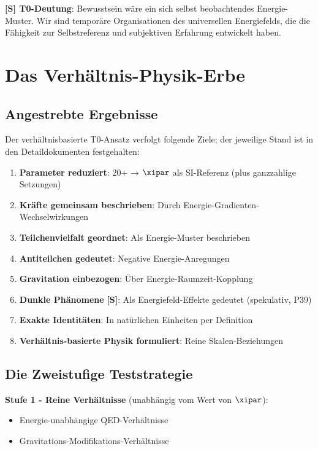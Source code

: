 	\textbf{[S] T0-Deutung}: Bewusstsein wäre ein sich selbst beobachtendes Energie-Muster. Wir sind temporäre Organisationen des universellen Energiefelds, die die Fähigkeit zur Selbstreferenz und subjektiven Erfahrung entwickelt haben.
	
	\section{Das Verhältnis-Physik-Erbe}
	
	\subsection{Angestrebte Ergebnisse}
	
	Der verhältnisbasierte T0-Ansatz verfolgt folgende Ziele; der jeweilige Stand ist in den Detaildokumenten festgehalten:
	
	\begin{enumerate}
		\item \textbf{Parameter reduziert}: 20+ → $\xipar$ als SI-Referenz (plus ganzzahlige Setzungen)
		\item \textbf{Kräfte gemeinsam beschrieben}: Durch Energie-Gradienten-Wechselwirkungen
		\item \textbf{Teilchenvielfalt geordnet}: Als Energie-Muster beschrieben
		\item \textbf{Antiteilchen gedeutet}: Negative Energie-Anregungen
		\item \textbf{Gravitation einbezogen}: Über Energie-Raumzeit-Kopplung
		\item \textbf{Dunkle Phänomene} \textbf{[S]}: Als Energiefeld-Effekte gedeutet (spekulativ, P39)
		\item \textbf{Exakte Identitäten}: In natürlichen Einheiten per Definition
		\item \textbf{Verhältnis-basierte Physik formuliert}: Reine Skalen-Beziehungen
	\end{enumerate}
	
	\subsection{Die Zweistufige Teststrategie}
	
	\textbf{Stufe 1 - Reine Verhältnisse} (unabhängig vom Wert von $\xipar$):
	\begin{itemize}
		\item Energie-unabhängige QED-Verhältnisse
		\item Gravitations-Modifikations-Verhältnisse
	\end{itemize}
	
